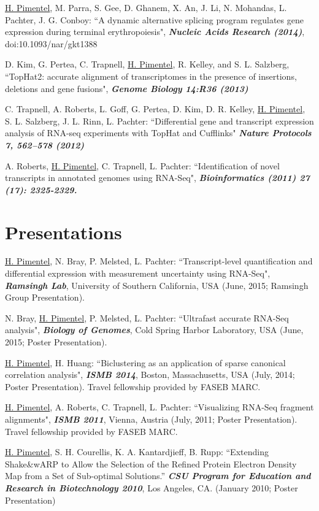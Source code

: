 \documentclass[margin,line]{res}
\begin{document}
\begin{resume}
\underline{H. Pimentel}, M. Parra, S. Gee, D. Ghanem, X. An, J. Li, N.
Mohandas, L. Pachter, J. G. Conboy: ``A dynamic alternative splicing program
regulates gene expression during terminal erythropoiesis", {\bf \emph{Nucleic
    Acids Research (2014)}}, doi:10.1093/nar/gkt1388

D. Kim, G. Pertea, C. Trapnell, \underline{H. Pimentel}, R. Kelley, and S.
L. Salzberg, ``TopHat2: accurate alignment of transcriptomes in the presence of
insertions, deletions and gene fusions", {\bf \emph{Genome Biology
    14:R36 (2013)}}

\newpage

C. Trapnell, A. Roberts, L. Goff, G. Pertea, D. Kim, D. R. Kelley,
\underline{H. Pimentel}, S. L. Salzberg, J. L. Rinn, L. Pachter: ``Differential
gene and transcript expression analysis of RNA-seq experiments with TopHat and
Cufflinks" {\bf \emph{Nature Protocols 7, 562–578 (2012)}}

A. Roberts, \underline{H. Pimentel}, C. Trapnell, L. Pachter: ``Identification
of novel transcripts in annotated genomes using RNA-Seq", {\bf
  \emph{Bioinformatics (2011) 27 (17): 2325-2329.}}

\section{\sc Presentations}

\underline{H. Pimentel}, N. Bray, P. Melsted, L. Pachter: ``Transcript-level
quantification and differential expression with measurement uncertainty using
RNA-Seq", {\bf \emph{Ramsingh Lab}}, University of Southern California, USA (June,
2015; Ramsingh Group Presentation).

N. Bray, \underline{H. Pimentel}, P. Melsted, L. Pachter: ``Ultrafast accurate
RNA-Seq analysis", {\bf \emph{Biology of Genomes}}, Cold Spring Harbor
Laboratory, USA (June, 2015; Poster Presentation).

\underline{H. Pimentel}, H. Huang: ``Biclustering as an application of sparse
canonical correlation analysis", {\bf \emph{ISMB 2014}}, Boston, Massachusetts,
USA (July, 2014; Poster Presentation). Travel fellowship provided by FASEB
MARC.

\underline{H. Pimentel}, A. Roberts, C. Trapnell, L. Pachter: ``Visualizing
RNA-Seq fragment alignments", {\bf \emph{ISMB 2011}}, Vienna, Austria (July,
2011; Poster Presentation). Travel fellowship provided by FASEB MARC.

\underline{H. Pimentel}, S. H. Courellis, K. A. Kantardjieff, B. Rupp:
``Extending Shake\&wARP to Allow the Selection of the Refined Protein Electron
Density Map from a Set of Sub-optimal Solutions.'' {\bf \emph{CSU Program for
    Education and Research in Biotechnology 2010}}, Los Angeles, CA. (January
2010; Poster Presentation)


\end{resume}
\end{document}
